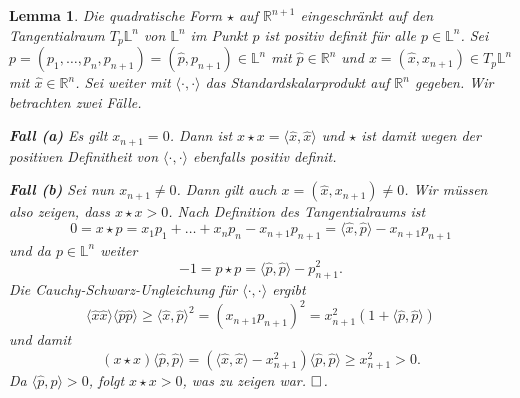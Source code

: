 \documentclass[11pt]{book}
\numberwithin{dummy}{section}
\newtheorem{lemma}[theorem]{Lemma}
\theoremstyle{nonumberbreak}
\newenvironment{pr}[1][]{\ifthenelse{\equal{#1}{}}{\proof}{\proof[#1]}\rm}{\endproof}
\newcommand{\Loid}{\mathbb{L}}
\newcommand{\R}{\mathbb{R}}
\begin{document}
\begin{spacing}{1.4}
\hypertarget{lemmavierzweieins}{}
\begin{lemma} %
Die quadratische Form $\star$ auf $\R^{n+1}$ eingeschränkt auf den Tangentialraum $T_p \Loid^n$ von $\Loid^n$ im Punkt $p$ ist positiv definit für alle $p \in \Loid^n$.
\begin{pr}
Sei $p=(p_1, \ldots, p_n, p_{n+1}) = (\hat{p}, p_{n+1}) \in \Loid^n$ mit $\hat{p} \in \R^n$ und $x=(\hat{x},x_{n+1}) \in T_p \Loid^n$ mit $\hat{x} \in \R^n$. Sei weiter mit $\langle \cdot, \cdot \rangle$ das Standardskalarprodukt auf $\R^n$ gegeben. Wir betrachten zwei Fälle.
\begin{compactenum}
\item[\textbf{Fall (a)}] Es gilt $x_{n+1}=0$. Dann ist $x\star x = \langle \hat{x}, \hat{x}\rangle$ und $\star$ ist damit wegen der positiven Definitheit von $\langle \cdot, \cdot \rangle$ ebenfalls positiv definit.
\item[\textbf{Fall (b)}] Sei nun $x_{n+1}\neq 0$. Dann gilt auch $x=( \hat{x}, x_{n+1}) \neq 0$. Wir müssen also zeigen, dass $x \star x >0$. Nach Definition des Tangentialraums ist 
$$0=x \star p = x_1p_1 + \ldots + x_np_n - x_{n+1} p_{n+1} = \langle \hat{x}, \hat{p} \rangle - x_{n+1} p_{n+1}$$
und da $p\in \Loid^n$  weiter
$$-1= p \star p = \langle \hat{p}, \hat{p} \rangle - p_{n+1}^2.$$
Die Cauchy-Schwarz-Ungleichung für $\langle \cdot, \cdot \rangle$ ergibt 
$$\langle \hat{x} \hat{x} \rangle \langle \hat{p} \hat{p} \rangle \geqslant \langle \hat{x}, \hat{p} \rangle^2 = (x_{n+1} p_{n+1})^2 = x_{n+1}^2 (1 + \langle \hat{p}, \hat{p} \rangle )$$
und damit
$$(x \star x) \langle \hat{p}, \hat{p} \rangle = \left( \langle \hat{x}, \hat{x} \rangle - x_{n+1}^2\right) \langle \hat{p}, \hat{p} \rangle \geqslant x_{n+1}^2 >0.$$
Da $\langle \hat{p}, \hat{p} \rangle >0$, folgt $x \star x >0$, was zu zeigen war. $\hfill \Box$.


\end{compactenum}

\end{pr}
\end{lemma}



\end{spacing}
\end{document}
